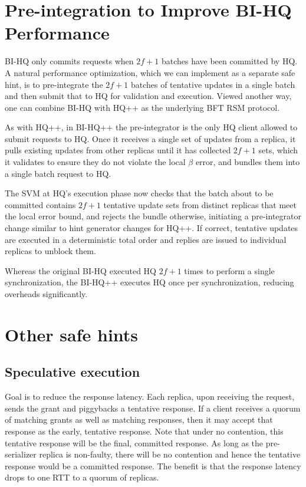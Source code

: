 \documentclass[twocolumn,10pt]{article}
\begin{document}

\section{Pre-integration to Improve BI-HQ Performance}
\label{sec:bihq++}

BI-HQ only commits requests when $2f+1$ batches have been committed by
HQ. A natural performance optimization, which we can implement as a
separate safe hint, is to pre-integrate the $2f+1$ batches of tentative
updates in a single batch and then submit that to HQ for validation and
execution.  Viewed another way, one can combine BI-HQ with HQ++ as the
underlying BFT RSM protocol.

As with HQ++, in BI-HQ++ the pre-integrator is the only HQ client
allowed to submit requests to HQ.  Once it receives a single set of
updates from a replica, it pulls existing updates from other replicas
until it has collected $2f+1$ sets, which it validates to ensure they do
not violate the local $\beta$ error, and bundles them into a single batch
request to HQ.

The SVM at HQ's execution phase now checks that the batch about to be
committed contains $2f+1$ tentative update sets from distinct replicas
that meet the local error bound, and rejects the bundle otherwise,
initiating a pre-integrator change similar to hint generator changes for
HQ++.  If correct, tentative updates are executed in a deterministic
total order and replies are issued to individual replicas to unblock
them.

Whereas the original BI-HQ executed HQ $2f+1$ times to perform a single
synchronization, the BI-HQ++ executes HQ once per synchronization,
reducing overheads significantly.

\fi


\section{Other safe hints}

\subsection{Speculative execution}
Goal is to reduce the response latency. Each replica,
upon receiving the request, sends the grant and piggybacks a tentative response. If a
client receives a quorum of matching grants as well as matching responses, then it
may accept that response as the early, tentative response. Note that under no
contention, this tentative response will be the final, committed response. As long as the
pre-serializer replica is non-faulty, there will be no contention and hence the 
tentative response would be a committed response. The benefit is that the response latency
drops to one RTT to a quorum of replicas.
\end{document}
